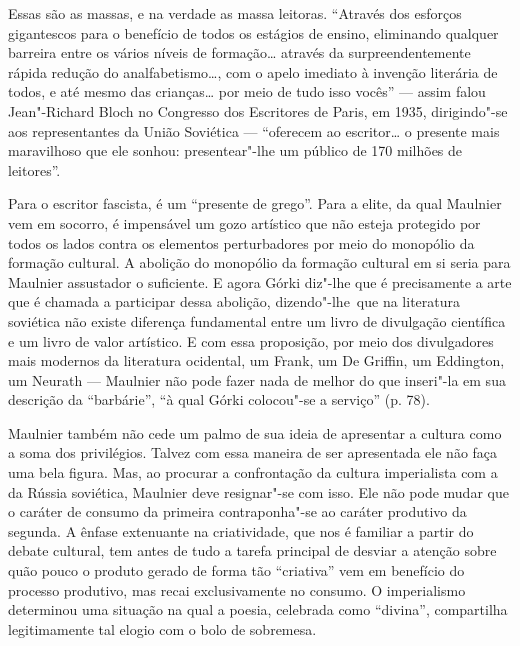 Essas são as massas, e na verdade as massa leitoras. ``Através dos esforços
gigantescos para o benefício de todos os estágios de ensino, eliminando
qualquer barreira entre os vários níveis de formação\ldots{} através da
surpreendentemente rápida redução do analfabetismo\ldots{}, com o apelo
imediato à invenção literária de todos, e até mesmo das crianças\ldots{} por
meio de tudo isso vocês'' --- assim falou Jean"-Richard Bloch no Congresso
dos Escritores de Paris, em 1935, dirigindo"-se aos representantes da
União Soviética --- ``oferecem ao escritor\ldots{} o presente mais
maravilhoso que ele sonhou: presentear"-lhe um público de 170 milhões de
leitores''.

Para o escritor fascista, é um ``presente de grego''. Para a elite, da qual Maulnier vem em socorro, é impensável um gozo artístico que não esteja protegido por todos os lados contra os elementos perturbadores por meio do monopólio da formação cultural. A abolição do monopólio da formação cultural em si seria para
Maulnier assustador o suficiente. E agora Górki diz"-lhe que é
precisamente a arte que é chamada a participar dessa abolição,
dizendo"-lhe~que na literatura soviética não existe diferença fundamental
entre um livro de divulgação científica e um livro de valor artístico. E
com essa proposição, por meio dos divulgadores mais modernos da literatura
ocidental, um Frank, um De Griffin, um Eddington, um Neurath --- Maulnier %
não pode fazer nada de melhor do que inseri"-la em sua descrição da
``barbárie'', ``à qual Górki colocou"-se a serviço'' (p. 78).

Maulnier também não cede um palmo de sua ideia de apresentar a cultura
como a soma dos privilégios. Talvez com essa maneira de ser apresentada ele não faça
uma bela figura. Mas, ao procurar a confrontação da cultura imperialista com a da
Rússia soviética, Maulnier deve resignar"-se com isso. Ele não pode mudar
que o caráter de consumo da primeira contraponha"-se ao caráter produtivo da segunda. A ênfase extenuante na criatividade, que nos é
familiar a partir do debate cultural, tem antes de tudo a tarefa
principal de desviar a atenção sobre quão pouco o produto gerado de
forma tão ``criativa'' vem em benefício do processo produtivo, mas
recai exclusivamente no consumo. O imperialismo determinou uma situação
na qual a poesia, celebrada como ``divina'', compartilha legitimamente tal elogio com o bolo de sobremesa.

